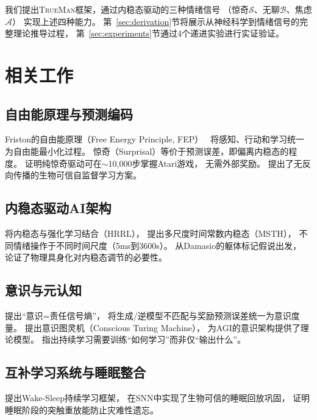 \documentclass[11pt,a4paper]{article}
\newcommand{\TrueMan}{\textsc{TrueMan}}
\newcommand{\surprise}{\mathcal{S}}
\newcommand{\boredom}{\mathcal{B}}
\newcommand{\anxiety}{\mathcal{A}}
\begin{document}
我们提出\TrueMan{}框架，通过内稳态驱动的三种情绪信号
（惊奇$\surprise$、无聊$\boredom$、焦虑$\anxiety$）
实现上述四种能力。
第~\ref{sec:derivation}节将展示从神经科学到情绪信号的完整理论推导过程，
第~\ref{sec:experiments}节通过4个递进实验进行实证验证。

\section{相关工作}

\subsection{自由能原理与预测编码}

Friston的自由能原理（Free Energy Principle, FEP）~\cite{friston2022active}
将感知、行动和学习统一为自由能最小化过程。
惊奇（Surprisal）等价于预测误差，即偏离内稳态的程度。
\citet{heins2025axiom}证明纯惊奇驱动可在$\sim$10,000步掌握Atari游戏，
无需外部奖励。
\citet{ororbia2025meta}提出了无反向传播的生物可信自监督学习方案。

\subsection{内稳态驱动AI架构}

\citet{yoshida2025hrrl}将内稳态与强化学习结合（HRRL），
\citet{hakim2026msth}提出多尺度时间常数内稳态（MSTH），
不同情绪操作于不同时间尺度（5ms到3600s）。
\citet{christov2025embodiment}从Damasio的躯体标记假说出发，
论证了物理具身化对内稳态调节的必要性。

\subsection{意识与元认知}

\citet{kawato2023metacognitive}提出``意识=责任信号熵''，
将生成/逆模型不匹配与奖励预测误差统一为意识度量。
\citet{blum2023ctm}提出意识图灵机（Conscious Turing Machine），
为AGI的意识架构提供了理论模型。
\citet{mineault2026dark}指出持续学习需要训练``如何学习''而非仅``输出什么''。

\subsection{互补学习系统与睡眠整合}

\citet{sorrenti2024wake}提出Wake-Sleep持续学习框架，
\citet{delanois2026sleep}在SNN中实现了生物可信的睡眠回放巩固，
\citet{krishnan2019sleep}证明睡眠阶段的突触重放能防止灾难性遗忘。
\end{document}
